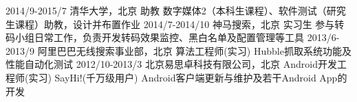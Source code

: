 \documentclass[]{friggeri-cv-cn}
\begin{document}
\begin{entrylist}
  \entry
    {2014/9-2015/7}
    {清华大学，北京}
    {助教}
    {数字媒体2（本科生课程）、软件测试（研究生课程）助教，设计并布置作业}
  \entry
    {2014/7-2014/10}
    {神马搜索，北京}
    {实习生}
    {参与转码小组日常工作，负责开发转码效果监控、黑白名单及配置管理等工具}
  \entry
    {2013/6-2013/9}
    {阿里巴巴无线搜索事业部，北京}
    {算法工程师(实习)}
    {Hubble抓取系统功能及性能自动化测试}
  \entry
    {2012/10-2013/3}
    {北京易思卓科技有限公司，北京}
    {Android开发工程师(实习)}
    {SayHi!(千万级用户) Android客户端更新与维护及若干Android App的开发}
\end{entrylist}
\end{document}
